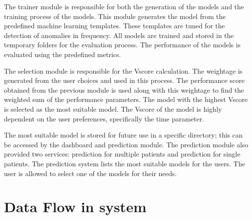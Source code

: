The trainer module is responsible for both the generation of the models and the training process of the models. This module generates the model from the predefined machine learning templates. These templates are tuned for the detection of anomalies in frequency. All models are trained and stored in the temporary folders for the evaluation process. The performance of the models is evaluated using the predefined metrics.

The selection module is responsible for the Vscore calculation. The weightage is generated from the user choices and used in this process. The performance score obtained from the previous module is used along with this weightage to find the weighted sum of the performance parameters. The model with the highest Vscore is selected as the most suitable model. The Vscore of the model is highly dependent on the user preferences, specifically the time parameter.

The most suitable model is stored for future use in a specific directory; this can be accessed by the dashboard and prediction module. The prediction module also provided two services: prediction for multiple patients and prediction for single patients. The prediction system lists the most suitable models for the users. The user is allowed to select one of the models for their needs.

\section{Data Flow in system}

